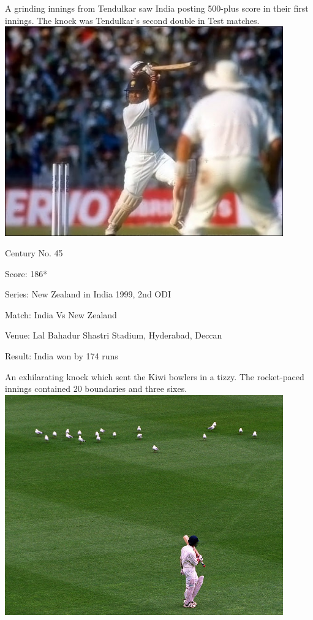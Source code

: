 \documentclass[11pt, a4paper]{article}
\begin{document}
A grinding innings from Tendulkar saw India posting 500-plus score in their first innings. The knock was Tendulkar's second double in Test matches. 
\newpage
\includegraphics[width=0.9\textwidth]{pics/45.jpg}

Century No. 45 

Score: 186* 

Series: New Zealand in India 1999, 2nd ODI 

Match: India Vs New Zealand 

Venue: Lal Bahadur Shastri Stadium, Hyderabad, Deccan 

Result: India won by 174 runs 

An exhilarating knock which sent the Kiwi bowlers in a tizzy. The rocket-paced innings contained 20 boundaries and three sixes.
\newpage
\includegraphics[width=0.9\textwidth]{pics/46.jpg}
\end{document}
